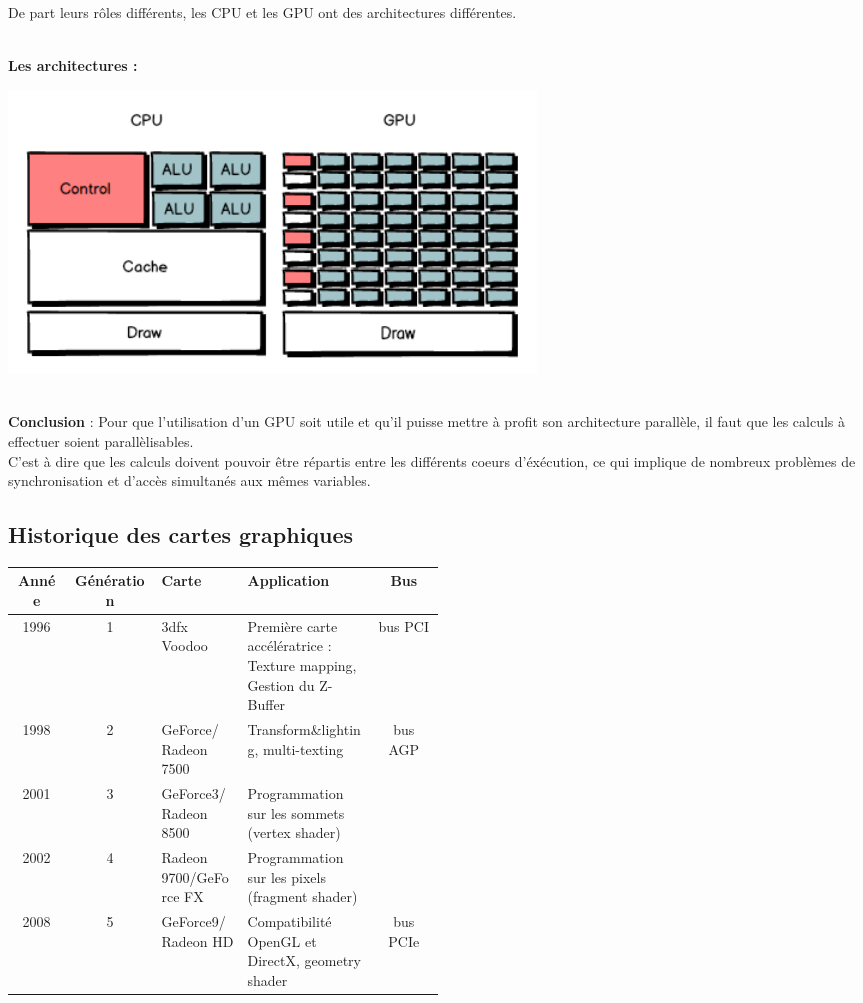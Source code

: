 De part leurs rôles différents, les CPU et les GPU ont des architectures différentes.

\textbf{\\Les architectures :}
\\
\begin{center}
\includegraphics[width=14cm]{pipeline/images/GPUCPU.png}
\end{center}

\textbf{\\Conclusion} : Pour que l’utilisation d’un GPU soit utile et qu'il puisse mettre à profit son architecture parallèle, il faut que les calculs à effectuer soient parallèlisables.\\
C'est à dire que les calculs doivent pouvoir être répartis entre les différents coeurs d'éxécution, ce qui implique de nombreux problèmes de synchronisation et d'accès simultanés aux mêmes variables.%



\subsection{Historique des cartes graphiques}
\begin{center}
\begin{tabular}{|c|c|m{0.2\linewidth}|m{0.3\linewidth} |c|}
\hline
Année & Génération & Carte & Application & Bus \\
\hline
1996 & 1 & 3dfx Voodoo & Première carte accélératrice : Texture mapping, Gestion du Z-Buffer & bus PCI\\
\hline
1998 & 2 & GeForce/ Radeon 7500 & Transform\&lighting, multi-texting & bus AGP \\
\cline{1-4}
2001 & 3 & GeForce3/ Radeon 8500 & Programmation sur les sommets (vertex shader)	& \\
\cline{1-4}
2002 & 4 & Radeon 9700/GeForce FX & Programmation sur les pixels (fragment shader)	& \\
\hline
2008 & 5 & GeForce9/ Radeon HD & Compatibilité OpenGL et DirectX,  geometry shader & bus PCIe \\
\hline
\end{tabular}
\end{center}

